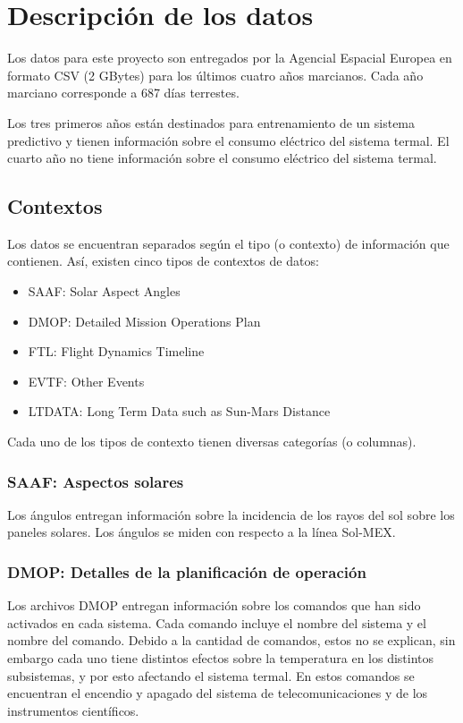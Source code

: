 \documentclass[../Main.tex]{subfiles}
\begin{document}
\section{Descripción de los datos}

Los datos para este proyecto son entregados por la Agencial Espacial Europea en formato CSV (2 GBytes) para los últimos cuatro años marcianos. Cada año marciano corresponde a 687 días terrestes.
\newline \par
Los tres primeros años están destinados para entrenamiento de un sistema predictivo y tienen información sobre el consumo eléctrico del sistema termal. El cuarto año no tiene información sobre el consumo eléctrico del sistema termal.
\subsection*{Contextos}
Los datos se encuentran separados según el tipo (o contexto) de información que contienen. Así, existen cinco tipos de contextos de datos:
\begin{itemize}
    \item SAAF: Solar Aspect Angles
    \item DMOP: Detailed Mission Operations Plan
    \item FTL: Flight Dynamics Timeline
    \item EVTF: Other Events
    \item LTDATA: Long Term Data such as Sun-Mars Distance
\end{itemize}

Cada uno de los tipos de contexto tienen diversas categorías (o columnas).
\subsubsection*{SAAF: Aspectos solares}
Los ángulos entregan información sobre la incidencia de los rayos del sol sobre los paneles solares. Los ángulos se miden con respecto a la línea Sol-MEX.
\subsubsection*{DMOP: Detalles de la planificación de operación}
Los archivos DMOP entregan información sobre los comandos que han sido activados en cada sistema. Cada comando incluye el nombre del sistema y el nombre del comando. Debido a la cantidad de comandos, estos no se explican, sin embargo cada uno tiene distintos efectos sobre la temperatura en los distintos subsistemas, y por esto afectando el sistema termal. En estos comandos se encuentran el encendio y apagado del sistema de telecomunicaciones y de los instrumentos científicos.
\end{document}
